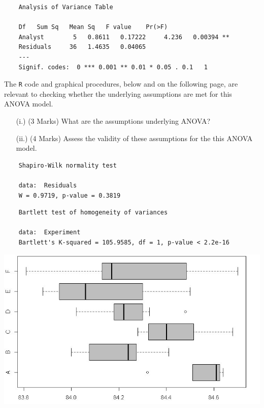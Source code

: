 \documentclass[a4paper,12pt]{article}
\begin{document}
\begin{framed}
	\begin{verbatim}
	Analysis of Variance Table
	
	Df   Sum Sq   Mean Sq   F value    Pr(>F)
	Analyst        5   0.8611   0.17222     4.236   0.00394 **
	Residuals     36   1.4635   0.04065
	---
	Signif. codes:  0 *** 0.001 ** 0.01 * 0.05 . 0.1   1
	\end{verbatim}
\end{framed}
The \texttt{R} code and graphical procedures, below and on the following page, are relevant to checking whether the underlying assumptions are met for this ANOVA model.
\begin{itemize}
	\item[(i.)] (3 Marks) What are the assumptions underlying ANOVA?
	\item[(ii.)] (4 Marks)  Assess the validity of these assumptions for the this ANOVA model.
\end{itemize}
\begin{framed}
	\begin{verbatim}
	Shapiro-Wilk normality test
	
	data:  Residuals
	W = 0.9719, p-value = 0.3819
	\end{verbatim}
\end{framed}
\begin{framed}
	\begin{verbatim}
	Bartlett test of homogeneity of variances
	
	data:  Experiment
	Bartlett's K-squared = 105.9585, df = 1, p-value < 2.2e-16
	\end{verbatim}
\end{framed}
\begin{center}
	\includegraphics[scale=0.59]{images/ExamQ5boxplot}
\end{center}
\end{document}
